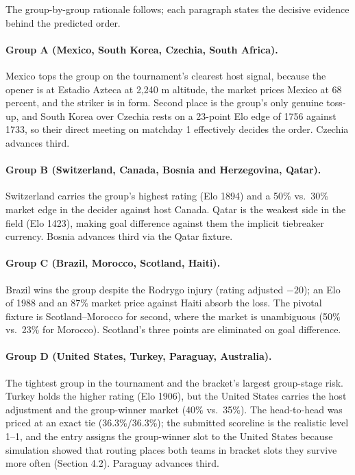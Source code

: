 \documentclass[11pt,letterpaper]{article}
\begin{document}




The group-by-group rationale follows; each paragraph states the decisive evidence behind the predicted order.

\paragraph{Group A (Mexico, South Korea, Czechia, South Africa).} Mexico tops the group on the tournament's clearest host signal, because the opener is at Estadio Azteca at 2{,}240 m altitude, the market prices Mexico at 68 percent, and the striker is in form. Second place is the group's only genuine toss-up, and South Korea over Czechia rests on a 23-point Elo edge of 1756 against 1733, so their direct meeting on matchday 1 effectively decides the order. Czechia advances third.




\paragraph{Group B (Switzerland, Canada, Bosnia and Herzegovina, Qatar).} Switzerland carries the group's highest rating (Elo 1894) and a 50\% vs.\ 30\% market edge in the decider against host Canada. Qatar is the weakest side in the field (Elo 1423), making goal difference against them the implicit tiebreaker currency. Bosnia advances third via the Qatar fixture.




\paragraph{Group C (Brazil, Morocco, Scotland, Haiti).} Brazil wins the group despite the Rodrygo injury (rating adjusted $-20$); an Elo of 1988 and an 87\% market price against Haiti absorb the loss. The pivotal fixture is Scotland--Morocco for second, where the market is unambiguous (50\% vs.\ 23\% for Morocco). Scotland's three points are eliminated on goal difference.




\paragraph{Group D (United States, Turkey, Paraguay, Australia).} The tightest group in the tournament and the bracket's largest group-stage risk. Turkey holds the higher rating (Elo 1906), but the United States carries the host adjustment and the group-winner market (40\% vs.\ 35\%). The head-to-head was priced at an exact tie (36.3\%/36.3\%); the submitted scoreline is the realistic level 1--1, and the entry assigns the group-winner slot to the United States because simulation showed that routing places both teams in bracket slots they survive more often (Section 4.2). Paraguay advances third.
\end{document}
